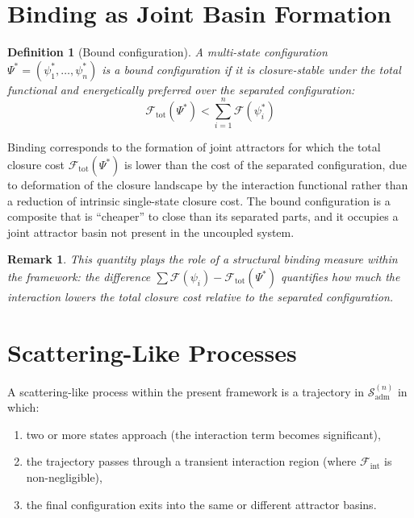 \documentclass[12pt]{article}
\newtheorem{definition}[theorem]{Definition}
\newtheorem{remark}[theorem]{Remark}
\newcommand{\Fcal}{\mathcal{F}}
\newcommand{\Sadm}{\mathcal{S}_{\mathrm{adm}}}
\newcommand{\Fint}{\Fcal_{\mathrm{int}}}
\newcommand{\Ftot}{\Fcal_{\mathrm{tot}}}
\begin{document}
\section{Binding as Joint Basin Formation}\label{sec:binding}

\begin{definition}[Bound configuration]\label{def:bound}
A multi-state configuration $\Psi^* = (\psi_1^*, \ldots, \psi_n^*)$ is a bound configuration if it is closure-stable under the total functional and energetically preferred over the separated configuration:
\begin{equation}\label{eq:binding}
    \Ftot(\Psi^*) < \sum_{i=1}^n \Fcal(\psi_i^*)
\end{equation}
\end{definition}

Binding corresponds to the formation of joint attractors for which the total closure cost $\Ftot(\Psi^*)$ is lower than the cost of the separated configuration, due to deformation of the closure landscape by the interaction functional rather than a reduction of intrinsic single-state closure cost. The bound configuration is a composite that is ``cheaper'' to close than its separated parts, and it occupies a joint attractor basin not present in the uncoupled system.

\begin{remark}
This quantity plays the role of a structural binding measure within the framework: the difference $\sum\Fcal(\psi_i) - \Ftot(\Psi^*)$ quantifies how much the interaction lowers the total closure cost relative to the separated configuration.
\end{remark}

\section{Scattering-Like Processes}\label{sec:scattering}

A scattering-like process within the present framework is a trajectory in $\Sadm^{(n)}$ in which:
\begin{enumerate}
    \item two or more states approach (the interaction term becomes significant),
    \item the trajectory passes through a transient interaction region (where $\Fint$ is non-negligible),
    \item the final configuration exits into the same or different attractor basins.
\end{enumerate}
\end{document}
